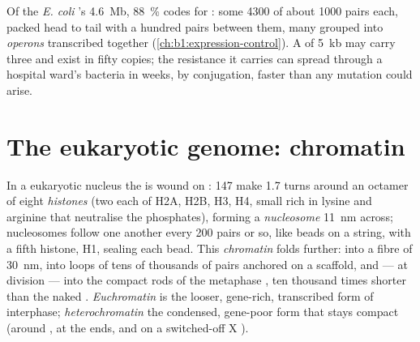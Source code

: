 \begin{example}\label{ex:b1:genomes:dense}
Of the \emph{E. coli} 's \qty{4.6}{Mb}, \qty{88}{\%} codes
for : some \num{4300}  of about \num{1000} pairs each,
packed head to tail with a hundred pairs between them, many grouped
into \emph{operons} transcribed together (\cref{ch:b1:expression-control}).
A  of \qty{5}{kb} may carry three  and exist in fifty
copies; the resistance  it carries can spread through a hospital
ward's bacteria in weeks, by conjugation, faster than any mutation
could arise.
\end{example}

\section{The eukaryotic genome: chromatin}

\begin{definition}\label{def:b1:genomes:nucleosome}
In a eukaryotic nucleus the  is wound on : \qty{147}{}  make 1.7 turns around an octamer of eight \emph{histones}
(two each of H2A, H2B, H3, H4, small  rich in lysine and
arginine that neutralise the phosphates), forming a
\emph{nucleosome} \qty{11}{nm} across; nucleosomes
follow one another every \qty{200}{} pairs or so, like beads on a
string, with a fifth histone, H1, sealing each bead. This
\emph{chromatin} folds further: into a fibre of \qty{30}{nm}, into
loops of tens of thousands of pairs anchored on a  scaffold,
and --- at division --- into the compact rods of the metaphase
, ten thousand times shorter than the naked .
\emph{Euchromatin} is the looser, gene-rich, transcribed form of
interphase; \emph{heterochromatin} the condensed, gene-poor form that
stays compact (around , at the ends, and on a switched-off
X ).
\end{definition}

